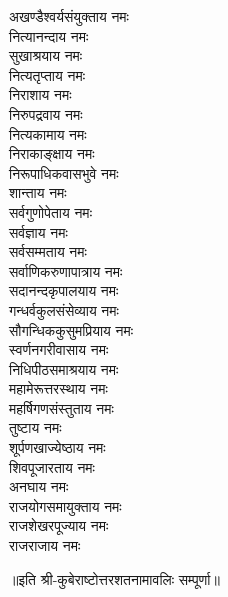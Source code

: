 \begin{multicols}{2}
\begin{flushleft}
अखण्डैश्वर्यसंयुक्ताय नमः\\
नित्यानन्दाय नमः\\
सुखाश्रयाय नमः\\
नित्यतृप्ताय नमः\\
निराशाय नमः\\
निरुपद्रवाय नमः\\
नित्यकामाय नमः\\
निराकाङ्क्षाय नमः\\
निरूपाधिकवासभुवे नमः\hfill{}\\ %
शान्ताय नमः\\
सर्वगुणोपेताय नमः\\
सर्वज्ञाय नमः\\
सर्वसम्मताय नमः\\
सर्वाणिकरुणापात्राय नमः\\
सदानन्दकृपालयाय नमः\\
गन्धर्वकुलसंसेव्याय नमः\\
सौगन्धिककुसुमप्रियाय नमः\\
स्वर्णनगरीवासाय नमः\\
निधिपीठसमाश्रयाय नमः\hfill{}\\ %
महामेरूत्तरस्थाय नमः\\
महर्षिगणसंस्तुताय नमः\\
तुष्टाय नमः\\
शूर्पणखाज्येष्ठाय नमः\\
शिवपूजारताय नमः\\
अनघाय नमः\\
राजयोगसमायुक्ताय नमः\\
राजशेखरपूज्याय नमः\\
राजराजाय नमः\\ %
\end{flushleft}
\end{multicols}
॥इति श्री-कुबेराष्टोत्तरशतनामावलिः सम्पूर्णा॥
